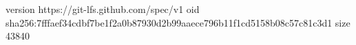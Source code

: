 version https://git-lfs.github.com/spec/v1
oid sha256:7fffaef34cdbf7be1f2a0b87930d2b99aaece796b11f1cd5158b08c57c81c3d1
size 43840
